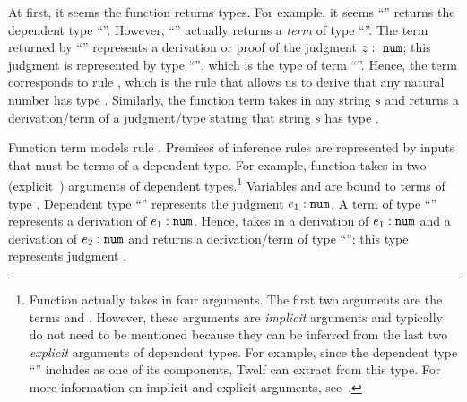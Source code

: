 At first, it seems the  function returns types.
For example, it seems ``'' returns
the dependent type ``\mbox{}''.
However, ``'' actually returns
a \emph{term} of type ``\mbox{}''.
The term returned by ``'' represents a derivation
or proof of the judgment $z :\ \code{num}$;
this judgment is represented by type ``\mbox{}'',
which is the type of term ``''.
Hence, the  term corresponds to rule ,
which is the rule that allows us to derive that any natural
number has type .
Similarly, the  function term takes in any string $s$
and returns a derivation/term of a judgment/type stating that
string $s$ has type .

Function term  models rule .
Premises of inference rules are represented by inputs that must be
terms of a dependent type.
For example, function  takes in two
(explicit~\cite{Twelf-Implicit}) arguments of dependent types.\footnote{
Function  actually takes in four arguments.
The first two arguments are the  terms  and
.
However, these arguments are \emph{implicit} arguments and
typically do not need to be mentioned because they can be inferred
from the last two \emph{explicit} arguments of dependent types.
For example, since the dependent type ``\mbox{}'' includes
 as one of its components, Twelf can extract 
from this type.
For more information on implicit and explicit arguments,
see~\cite{Twelf-Implicit}.}
Variables  and  are bound to terms of type .
Dependent type ``\mbox{}'' represents the judgment
$e_1 : \texttt{num}$.
A term of type ``\mbox{}'' represents a derivation
of $e_1 : \texttt{num}$.
Hence,  takes in a derivation of $e_1 : \texttt{num}$
and a derivation of $e_2 : \texttt{num}$ and returns
a derivation/term of type ``\mbox{}'';
this type represents judgment \mbox{}.


